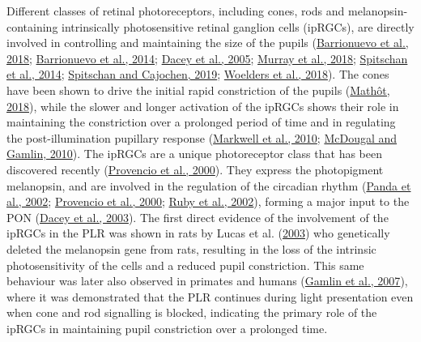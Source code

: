 \documentclass[
]{article}
\begin{document}
Different classes of retinal photoreceptors, including cones, rods and melanopsin-containing intrinsically photosensitive retinal ganglion cells (ipRGCs), are directly involved in controlling and maintaining the size of the pupils (\protect\hyperlink{ref-Barrionuevo2018}{Barrionuevo et al., 2018}; \protect\hyperlink{ref-Barrionuevo2014}{Barrionuevo et al., 2014}; \protect\hyperlink{ref-Dacey2005}{Dacey et al., 2005}; \protect\hyperlink{ref-Murray2018}{Murray et al., 2018}; \protect\hyperlink{ref-Spitschan2014}{Spitschan et al., 2014}; \protect\hyperlink{ref-Spitschan2019}{Spitschan and Cajochen, 2019}; \protect\hyperlink{ref-Woelders2018}{Woelders et al., 2018}). The cones have been shown to drive the initial rapid constriction of the pupils (\protect\hyperlink{ref-Mathot2018}{Mathôt, 2018}), while the slower and longer activation of the ipRGCs shows their role in maintaining the constriction over a prolonged period of time and in regulating the post-illumination pupillary response (\protect\hyperlink{ref-Markwell2010}{Markwell et al., 2010}; \protect\hyperlink{ref-McDougal2010}{McDougal and Gamlin, 2010}). The ipRGCs are a unique photoreceptor class that has been discovered recently (\protect\hyperlink{ref-Provencio2000}{Provencio et al., 2000}). They express the photopigment melanopsin, and are involved in the regulation of the circadian rhythm (\protect\hyperlink{ref-Panda2002}{Panda et al., 2002}; \protect\hyperlink{ref-Provencio2000}{Provencio et al., 2000}; \protect\hyperlink{ref-Ruby2002}{Ruby et al., 2002}), forming a major input to the PON (\protect\hyperlink{ref-Dacey2003}{Dacey et al., 2003}). The first direct evidence of the involvement of the ipRGCs in the PLR was shown in rats by Lucas et al. (\protect\hyperlink{ref-Lucas2003}{2003}) who genetically deleted the melanopsin gene from rats, resulting in the loss of the intrinsic photosensitivity of the cells and a reduced pupil constriction. This same behaviour was later also observed in primates and humans (\protect\hyperlink{ref-Gamlin2007}{Gamlin et al., 2007}), where it was demonstrated that the PLR continues during light presentation even when cone and rod signalling is blocked, indicating the primary role of the ipRGCs in maintaining pupil constriction over a prolonged time.
\end{document}
